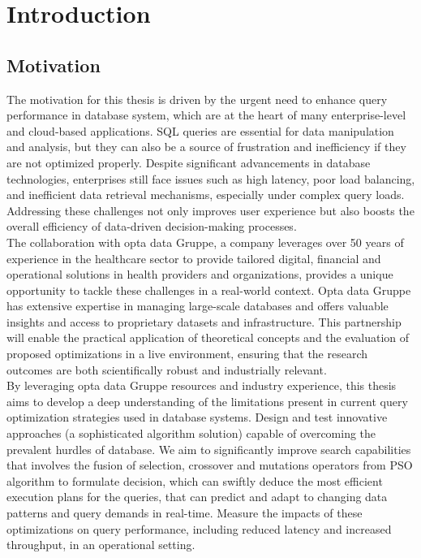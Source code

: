 \section{Introduction}
\subsection{Motivation} The motivation for this thesis is driven by the urgent need to enhance query performance in database system, which are at the heart of many enterprise-level and cloud-based applications. SQL queries are essential for data manipulation and analysis, but they can also be a source of frustration and inefficiency if they are not optimized properly. Despite significant advancements in database technologies, enterprises still face issues such as high latency, poor load balancing, and inefficient data retrieval mechanisms, especially under complex query loads. Addressing these challenges not only improves user experience but also boosts the overall efficiency of data-driven decision-making processes.\\
The collaboration with opta data Gruppe, a company leverages over 50 years of experience in the healthcare sector to provide tailored digital, financial and operational solutions in health providers and organizations, provides a unique opportunity to tackle these challenges in a real-world context. Opta data Gruppe has extensive expertise in managing large-scale databases and offers valuable insights and access to proprietary datasets and infrastructure. This partnership will enable the practical application of theoretical concepts and the evaluation of proposed optimizations in a live environment, ensuring that the research outcomes are both scientifically robust and industrially relevant.\\
By leveraging opta data Gruppe resources and industry experience, this thesis aims to develop a deep understanding of the limitations present in current query optimization strategies used in database systems. Design and test innovative approaches (a sophisticated algorithm solution) capable of overcoming the prevalent hurdles of database. We aim to significantly improve search capabilities that involves the fusion of selection, crossover and mutations operators from PSO algorithm to formulate decision, which can swiftly deduce the most efficient execution plans for the queries, that can predict and adapt to changing data patterns and query demands in real-time. Measure the impacts of these optimizations on query performance, including reduced latency and increased throughput, in an operational setting.\\

